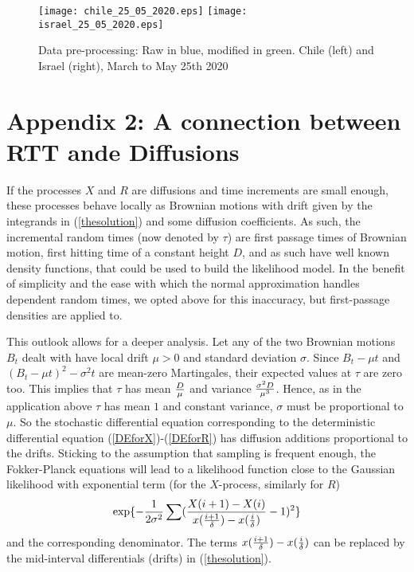 \documentclass{article}
\begin{document}
\begin{figure}[H]
    \begin{center}
        {\texttt{[image: chile\_25\_05\_2020.eps]}}
        \qquad
        {\texttt{[image: israel\_25\_05\_2020.eps]}}
    \end{center}
    \begin{center}
    \caption{Data pre-processing: Raw in blue, modified in green. Chile (left) and Israel (right), March to May 25th 2020
    }
\label{fig:chile_and_israel_25_05_2020}
    \end{center}
\end{figure}

\section{Appendix 2: A connection between RTT ande Diffusions}

If the processes $X$ and $R$ are diffusions and time increments are small enough, these processes behave locally as Brownian motions with drift given by the integrands in (\ref{thesolution}) and some diffusion coefficients. As such, the incremental random times (now denoted by $\tau$) are first passage times of Brownian motion, first hitting time of a constant height $D$, and as such have well known density functions, that could be used to build the likelihood model. In the benefit of simplicity and the ease with which the normal approximation handles dependent random times, we opted above for this inaccuracy, but first-passage densities are applied to.

This outlook allows for a deeper analysis. Let any of the two Brownian motions $B_t$ dealt with have local drift $\mu>0$ and standard deviation $\sigma$. Since $B_t - \mu t$ and $(B_t - \mu t)^2 - \sigma^2 t$ are mean-zero Martingales, their expected values at $\tau$ are zero too. This implies that $\tau$ has mean ${D \over \mu}$ and variance ${{\sigma^2 D} \over {\mu^3}}$. Hence, as in the application above $\tau$ has mean $1$ and constant variance, $\sigma$ must be proportional to $\mu$. So the stochastic differential equation corresponding to the deterministic differential equation (\ref{DEforX})-(\ref{DEforR}) has diffusion additions proportional to the drifts. Sticking to the assumption that sampling is frequent enough, the Fokker-Planck equations will lead to a likelihood function close to the Gaussian likelihood with exponential term (for the $X$-process, similarly for $R$)
\begin{equation}
    \exp\{-{1 \over {2 \sigma^2}}\sum ({{X(i+1)-X(i)} \over {{x({{i+1} \over \delta})-x({{i} \over \delta})}}}-1)^2\}
\end{equation}
and the corresponding denominator. The terms ${{x({{i+1} \over \delta})-x({{i} \over \delta})}}$ can be replaced by the mid-interval differentials (drifts) in (\ref{thesolution}).
\end{document}
